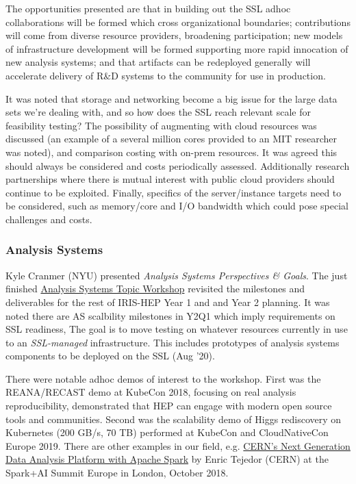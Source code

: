 \documentclass[11pt,letterpaper,fleqn]{article}
\begin{document}
The opportunities presented are that in building out the SSL adhoc collaborations will be formed which cross organizational boundaries; contributions will come from diverse resource providers, broadening participation; new models of infrastructure development will be formed supporting more rapid innocation of new analysis systems; and that artifacts can be redeployed generally will accelerate delivery of R\&D systems to the community for use in production. 

It was noted that storage and networking become a big issue for the large data sets we’re dealing with, and so how does the SSL reach relevant scale for feasibility testing?  The possibility of augmenting with cloud resources was discussed (an example of a several million cores provided to an MIT researcher was noted), and comparison costing with on-prem resources.  It was agreed this should always be considered and costs periodically assessed.  Additionally research partnerships where there is mutual interest with public cloud providers should continue to be exploited.   Finally, specifics of the server/instance targets need to be considered, such as memory/core and I/O bandwidth which could pose special challenges and costs.


\subsubsection{Analysis Systems}
Kyle Cranmer (NYU) presented {\it Analysis Systems Perspectives \& Goals}.  The just finished \href{https://indico.cern.ch/event/822074/}{Analysis Systems Topic Workshop} revisited the milestones and deliverables for the rest of IRIS-HEP Year 1 and and Year 2 planning.  It was noted there are AS scalbility milestones in Y2Q1 which imply requirements on SSL readiness,  The goal is to move testing on whatever resources currently in use to an {\it SSL-managed} infrastructure.
This includes prototypes of analysis systems components to be deployed on the SSL (Aug '20). 

There were notable adhoc demos of interest to the workshop. First was the REANA/RECAST demo at KubeCon 2018, focusing on real analysis reproducibility, demonstrated that HEP can engage with modern open source tools and communities.  Second was the scalability demo of Higgs rediscovery on Kubernetes (200 GB/s, 70 TB) performed at KubeCon and CloudNativeCon Europe 2019.  There are other examples in our field, e.g. \href{https://www.youtube.com/watch?v=Ye8MlJQumaI}{CERN’s Next Generation Data Analysis Platform with Apache Spark} by Enric Tejedor (CERN) at the Spark+AI Summit Europe in London, October 2018. 
\end{document}
